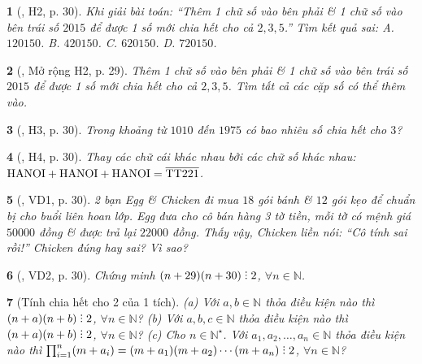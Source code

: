 \documentclass{article}
\newtheorem{baitoan}{}
\DeclareRobustCommand{\divby}{%
	\mathrel{\vbox{\baselineskip.65ex\lineskiplimit0pt\hbox{.}\hbox{.}\hbox{.}}}%
}
\begin{document}
\begin{baitoan}[\cite{Binh_boi_duong_Toan_6_tap_1}, H2, p. 30]
	Khi giải bài toán: ``Thêm 1 chữ số vào bên phải \& 1 chữ số vào bên trái số $2015$ để được 1 số mới chia hết cho cả $2,3,5$.'' Tìm kết quả sai: {\sf A.} $120150$. {\sf B.} $420150$. {\sf C.} $620150$. {\sf D.} $720150$.
\end{baitoan}

\begin{baitoan}[\cite{Binh_boi_duong_Toan_6_tap_1}, Mở rộng H2, p. 29]
	Thêm 1 chữ số vào bên phải \& 1 chữ số vào bên trái số $2015$ để được 1 số mới chia hết cho cả $2,3,5$. Tìm tất cả các cặp số có thể thêm vào.
\end{baitoan}

\begin{baitoan}[\cite{Binh_boi_duong_Toan_6_tap_1}, H3, p. 30]
	Trong khoảng từ $1010$ đến $1975$ có bao nhiêu số chia hết cho $3$?
\end{baitoan}

\begin{baitoan}[\cite{Binh_boi_duong_Toan_6_tap_1}, H4, p. 30]
	Thay các chữ cái khác nhau bởi các chữ số khác nhau: $\rm HANOI + HANOI + HANOI = \overline{TT221}$.
\end{baitoan}

\begin{baitoan}[\cite{Binh_boi_duong_Toan_6_tap_1}, VD1, p. 30]
	2 bạn Egg \& Chicken đi mua $18$ gói bánh \& $12$ gói kẹo để chuẩn bị cho buổi liên hoan lớp. Egg đưa cho cô bán hàng 3 tờ tiền, mỗi tờ có mệnh giá $50000$ đồng \& được trả lại $22000$ đồng. Thấy vậy, Chicken liền nói: ``Cô tính sai rồi!'' Chicken đúng hay sai? Vì sao?
\end{baitoan}

\begin{baitoan}[\cite{Binh_boi_duong_Toan_6_tap_1}, VD2, p. 30]
	Chứng minh $(n + 29)(n + 30)\divby2$, $\forall n\in\mathbb{N}$.
\end{baitoan}

\begin{baitoan}[Tính chia hết cho 2 của 1 tích]
	(a) Với $a,b\in\mathbb{N}$ thỏa điều kiện nào thì $(n + a)(n + b)\divby2$, $\forall n\in\mathbb{N}$? (b) Với $a,b,c\in\mathbb{N}$ thỏa điều kiện nào thì $(n + a)(n + b)\divby2$, $\forall n\in\mathbb{N}$? (c) Cho $n\in\mathbb{N}^\star$. Với $a_1,a_2,\ldots,a_n\in\mathbb{N}$ thỏa điều kiện nào thì $\prod_{i=1}^n (m + a_i) = (m + a_1)(m + a_2)\cdots(m + a_n)\divby2$, $\forall n\in\mathbb{N}$?
\end{baitoan}
\end{document}
